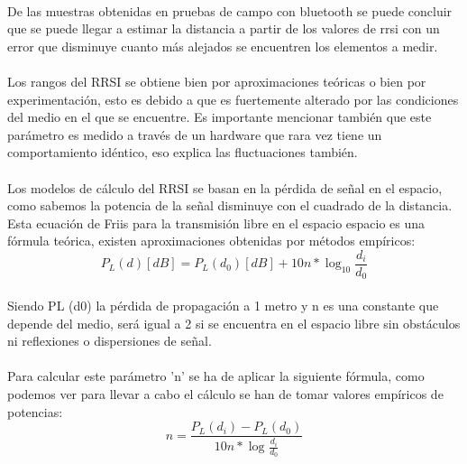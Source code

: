 \documentclass[a4paper ,12pt, onecolumn]{article}
\begin{document}
            \paragraph{}
            De las muestras obtenidas en pruebas de campo con bluetooth se puede concluir que se puede llegar a estimar la distancia
            a partir de los valores de rrsi con un error que disminuye cuanto más alejados se encuentren los elementos a medir. 
            \paragraph{}
            Los rangos del RRSI se obtiene bien por aproximaciones teóricas o bien por experimentación, esto es debido a que 
            es fuertemente alterado por las condiciones del medio en el que se encuentre. Es importante mencionar también que
            este parámetro es medido a través de un hardware que rara vez tiene un comportamiento idéntico, eso explica las fluctuaciones 
            también.
            \paragraph{}
            Los modelos de cálculo del RRSI se basan en la pérdida de señal en el espacio, como sabemos la potencia de la señal
            disminuye con el cuadrado de la distancia. Esta ecuación de Friis para la transmisión libre en el espacio espacio es 
            una fórmula teórica, existen aproximaciones obtenidas por métodos empíricos:
            \begin{equation}
                P_L(d) [dB] = P_L(d_0) [dB] + 10n * \log_{10} \frac{d_i}{d_0} 
            \end{equation}
            \paragraph{}
            Siendo PL (d0) la pérdida de propagación a 1 metro y n es una constante que depende del medio, será igual
            a 2 si se encuentra en el espacio libre sin obstáculos ni reflexiones o dispersiones de señal.
            \paragraph{}
            Para calcular este parámetro 'n' se ha de aplicar la siguiente fórmula, como podemos ver para llevar a cabo el 
            cálculo se han de tomar valores empíricos de potencias:
            \begin{equation}
                n = \frac{ P_L(d_i) - P_L(d_0) }{10n*\log_{}\frac{d_i}{d_0}}
            \end{equation}
\end{document}
